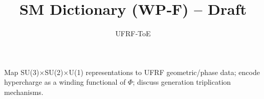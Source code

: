 \documentclass[11pt]{article}
\title{SM Dictionary (WP‑F) -- Draft}
\author{UFRF‑ToE}
\begin{document}
\maketitle
Map SU(3)$\times$SU(2)$\times$U(1) representations to UFRF geometric/phase data; encode hypercharge as a winding functional of $\Phi$; discuss generation triplication mechanisms.
\end{document}
